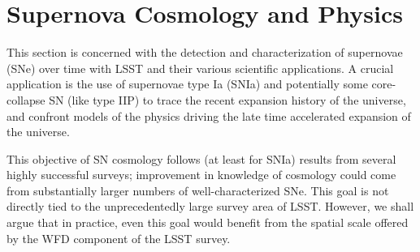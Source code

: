 %
%
%
%
%
%
%
\clearpage
\newpage

\section{Supernova Cosmology and Physics}
\def\secname{supernovae}\label{sec:\secname}



This section is concerned with the detection and characterization of
supernovae (SNe) over time with LSST and their various scientific
applications. A crucial application is the use of supernovae type
Ia (SNIa) and potentially some core-collapse SN (like type IIP) to trace
the recent expansion history of the universe, and confront models of the
physics driving the late time accelerated expansion of the universe.

This objective of SN cosmology follows (at least for SNIa) results from
several highly successful surveys; improvement in knowledge of cosmology
could come from substantially larger numbers of well-characterized SNe.
This goal is not directly tied to the unprecedentedly large survey area of
LSST. However, we shall argue that in practice, even this goal would
benefit from the spatial scale offered by the WFD component of the LSST
survey. 

